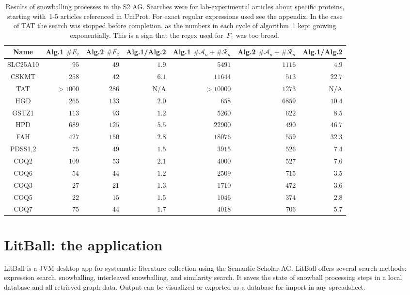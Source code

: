 \documentclass{article}
\begin{document}
\begin{table}[h]
    \centering
    \begin{tabular}{c|r|r|r|r|r|r}
        Name & Alg.1 $\#F_2$ & Alg.2 $\#F_2$ & Alg.1/Alg.2 & Alg.1 $\#\mathcal{A}_n + \#\mathcal{R}_n$ & Alg.2 $\#\mathcal{A}_n + \#\mathcal{R}_n$ & Alg.1/Alg.2 \\ \hline
        SLC25A10  & $95$ & $49$ & $\mathbf{1.9}$ & $5491$ & $1116$ & $\mathbf{4.9}$\\
        CSKMT & $258$ & $42$ & $\mathbf{6.1}$ & $11644$ & $513$ & $\mathbf{22.7}$ \\
        TAT & $>1000$ & $286$ & N/A & $>10000$ & $1273$ & N/A \\
        HGD & $265$ & $133$ & $\mathbf{2.0}$ & $658$ & $6859$ & $\mathbf{10.4}$ \\
        GSTZ1 & $113$ & $93$ & $\mathbf{1.2}$ & $5260$ & $622$ & $\mathbf{8.5}$ \\
        HPD & $689$ & $125$ & $\mathbf{5.5}$ & $22900$ & $490$ & $\mathbf{46.7}$ \\
        FAH & $427$ & $150$ & $\mathbf{2.8}$ & $18076$ & $559$ & $\mathbf{32.3}$ \\
        PDSS1,2 & $75$ & $49$ & $\mathbf{1.5}$ & $3915$ & $526$ & $\mathbf{7.4}$ \\
        COQ2 & $109$ & $53$ & $\mathbf{2.1}$ & $4000$ & $527$ & $\mathbf{7.6}$ \\
        COQ6 & $54$ & $44$ & $\mathbf{1.2}$ & $2509$ & $715$ & $\mathbf{3.5}$ \\
        COQ3 & $27$ & $21$ & $\mathbf{1.3}$ & $1710$ & $472$ & $\mathbf{3.6}$ \\
        COQ5 & $22$ & $15$ & $\mathbf{1.5}$ & $1046$ & $374$ & $\mathbf{2.8}$ \\
        COQ7 & $75$ & $44$ & $\mathbf{1.7}$ & $4018$ & $706$ & $\mathbf{5.7}$ \\
    \end{tabular}
    \caption{Results of snowballing processes in the S2 AG. Searches were for lab-experimental articles about specific proteins, starting with~1-5 articles referenced in UniProt. For exact regular expressions used see the appendix. In the case of TAT the search was stopped before completion, as the numbers in each cycle of algorithm~1 kept growing exponentially. This is a sign that the regex used for~$F_1$ was too broad. }
    \label{tab:1}
\end{table}

\section*{LitBall: the application}
LitBall\cite{litball} is a JVM desktop app for systematic literature collection using the Semantic Scholar AG. LitBall offers several search methods: expression search, snowballing, interleaved snowballing, and similarity search. It saves the state of snowball processing steps in a local database and all retrieved graph data. Output can be visualized or exported as a database for import in any spreadsheet.
\end{document}
